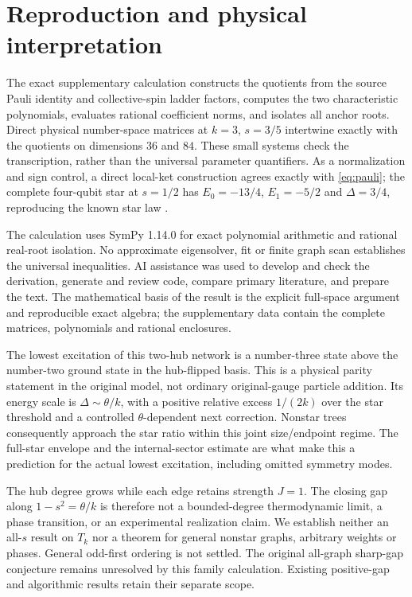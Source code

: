 \documentclass[11pt]{article}
\begin{document}
\section{Reproduction and physical interpretation}

The exact supplementary calculation constructs the quotients from
the source Pauli identity and collective-spin ladder factors,
computes the two characteristic polynomials, evaluates rational
coefficient norms, and isolates all anchor roots. Direct physical
number-space matrices at $k=3$, $s=3/5$ intertwine exactly with the
quotients on dimensions $36$ and $84$. These small systems check the
transcription, rather than the universal parameter quantifiers.
As a normalization and sign control, a direct local-ket construction
agrees exactly with \eqref{eq:pauli}; the complete four-qubit star at
$s=1/2$ has $E_0=-13/4$, $E_1=-5/2$ and $\Delta=3/4$, reproducing
the known star law \cite{Wong2026}.

The calculation uses SymPy 1.14.0 for exact polynomial arithmetic
and rational real-root isolation. No approximate eigensolver, fit
or finite graph scan establishes the universal inequalities.
AI assistance was used to develop and check the derivation, generate
and review code, compare primary literature, and prepare the text.
The mathematical basis of the result is the explicit full-space
argument and reproducible exact algebra; the supplementary data
contain the complete matrices, polynomials and rational enclosures.

The lowest excitation of this two-hub network is a number-three
state above the number-two ground state in the hub-flipped basis.
This is a physical parity statement in the original model, not
ordinary original-gauge particle addition. Its energy scale is
$\Delta\sim\theta/k$, with a positive relative excess $1/(2k)$
over the star threshold and a controlled $\theta$-dependent next
correction. Nonstar trees consequently approach the star ratio
within this joint size/endpoint regime. The full-star envelope and
the internal-sector estimate are what make this a prediction for
the actual lowest excitation, including omitted symmetry modes.

The hub degree grows while each edge retains strength $J=1$.
The closing gap along $1-s^2=\theta/k$ is therefore not a
bounded-degree thermodynamic limit, a phase transition, or an
experimental realization claim. We establish neither an all-$s$
result on $T_k$ nor a theorem for general nonstar graphs, arbitrary
weights or phases. General odd-first ordering is not settled.
The original all-graph sharp-gap conjecture remains unresolved by
this family calculation. Existing positive-gap and algorithmic
results retain their separate scope.
\end{document}
